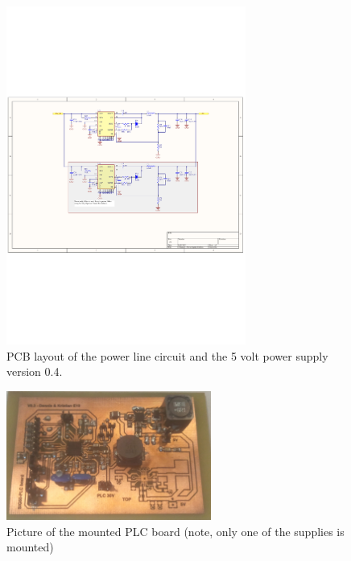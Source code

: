 \begin{figure}[H]
	\begin{centering}
		 \includegraphics[width=0.7\textwidth,page=3,angle=0]{content/appendix/eudp/images/SIG60_v0_4}
		\caption{PCB layout of the power line circuit and the 5 volt power supply version 0.4.}
	\end{centering}
\end{figure}

\begin{figure}[H]
	\begin{centering}
		\includegraphics[width=0.6\textwidth,page=1,angle=0]{content/appendix/eudp/images/plc_photo_v0_3.jpg}
		\caption{Picture of the mounted PLC board (note, only one of the supplies is mounted)}
		\label{fig:plc_photo_v0_3}
	\end{centering}
\end{figure}

